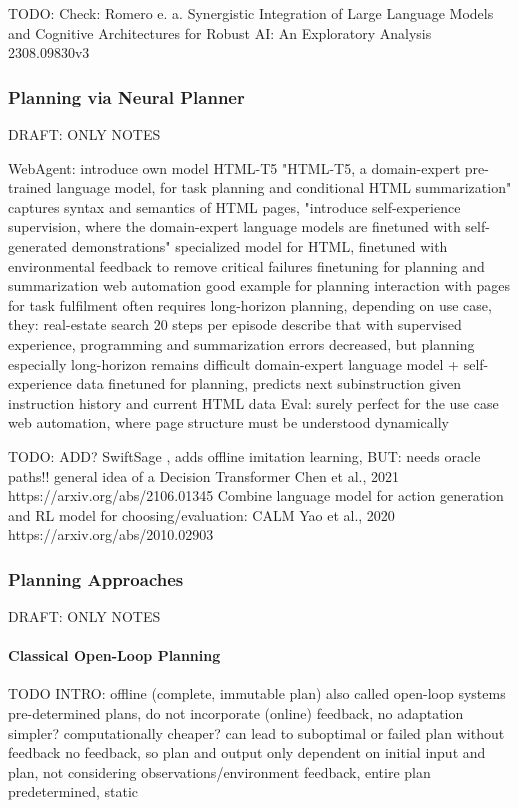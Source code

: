\documentclass{article}
\begin{document}
TODO: 
Check: Romero e. a. Synergistic Integration of Large Language Models and Cognitive Architectures for Robust AI: An Exploratory Analysis 2308.09830v3


\subsubsection{Planning via Neural Planner} \label{PlanningModuleNN}
DRAFT: ONLY NOTES

\cite{gur_real-world_2023} WebAgent: introduce own model HTML-T5 "HTML-T5, a domain-expert pre-trained language model, for task planning and conditional HTML summarization" captures syntax and semantics of HTML pages, "introduce self-experience supervision, where the domain-expert language models are finetuned with self-generated demonstrations"
specialized model for HTML, finetuned with environmental feedback to remove critical failures
finetuning for planning and summarization
web automation good example for planning interaction with pages for task fulfilment often requires long-horizon planning, depending on use case, they: real-estate search 20 steps per episode
describe that with supervised experience, programming and summarization errors decreased, but planning especially long-horizon remains difficult
domain-expert language model + self-experience data
finetuned for planning, predicts next subinstruction given instruction history and current HTML data
Eval: surely perfect for the use case web automation, where page structure must be understood dynamically

TODO: ADD?
SwiftSage \cite{lin_swiftsage_2023}, adds offline imitation learning, BUT: needs oracle paths!!
general idea of a Decision Transformer Chen et al., 2021 https://arxiv.org/abs/2106.01345
Combine language model for action generation and RL model for choosing/evaluation: CALM Yao et al., 2020 https://arxiv.org/abs/2010.02903

\subsubsection{Planning Approaches}
DRAFT: ONLY NOTES

\paragraph{Classical Open-Loop Planning}

TODO INTRO: 
offline (complete, immutable plan) 
also called open-loop systems 
pre-determined plans, do not incorporate (online) feedback, no adaptation 
simpler? computationally cheaper? 
can lead to suboptimal or failed plan without feedback 
no feedback, so plan and output only dependent on initial input and plan, not considering  observations/environment feedback, entire plan predetermined, static 
\end{document}
